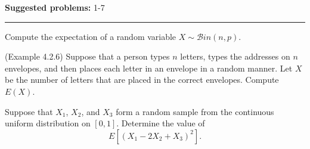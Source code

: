 \documentclass[12pt,reqno]{amsart}
\begin{document}
\textbf{Suggested problems:} 1-7

\bigskip
\hrule

\bigskip
\prob Compute the expectation of a random variable $X\sim \mathcal{B}in(n,p)$.
\vfill

\prob (Example 4.2.6) Suppose that a person types $n$ letters, types the addresses on $n$ envelopes, and then places each letter in an envelope in a random manner. Let $X$ be the number of letters that are placed in the correct envelopes. Compute $E(X)$.
\vfill

\prob Suppose that $X_1$, $X_2$, and $X_3$ form a random sample from the continuous uniform distribution on $[0,1]$. Determine the value of
\[
	E\left[ (X_1 - 2X_2 +X_3)^2 \right].
\]
\vfill
\end{document}
